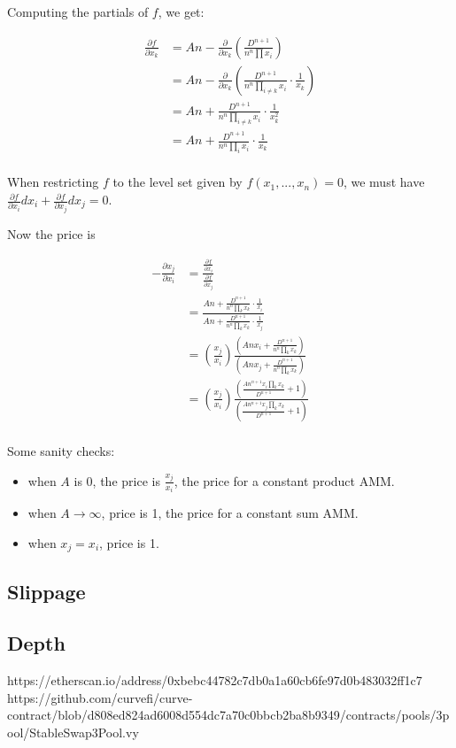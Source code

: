 \documentclass[
]{article}
\providecommand{\tightlist}{%
  \setlength{\itemsep}{0pt}\setlength{\parskip}{0pt}}
\begin{document}
Computing the partials of \(f\), we get:

\[\begin{aligned}
\frac{\partial f}{\partial x_k} &= A n - \frac{\partial}{\partial x_k}\left(\frac{D^{n+1}}{n^n \prod x_i}\right) \\
&= A n -  \frac{\partial}{\partial x_k}\left(\frac{D^{n+1}}{n^n \prod_{i\neq k} x_i} \cdot \frac{1}{x_k}\right)\\
&= A n + \frac{D^{n+1}}{n^n \prod_{i\neq k} x_i} \cdot \frac{1}{x_k^2} \\
&= A n + \frac{D^{n+1}}{n^n \prod_{i} x_i} \cdot \frac{1}{x_k} \\
\end{aligned}\]

When restricting \(f\) to the level set given by
\(f(x_1, ..., x_n) = 0\), we must have
\(\frac{\partial f}{\partial x_i} dx_i + \frac{\partial f}{\partial x_j} dx_j = 0\).

Now the price is

\[\begin{aligned}
- \frac{\partial x_j}{\partial x_i} &= \frac{\frac{\partial f}{\partial x_i}}{\frac{\partial f}{\partial x_j}}\\[1.2ex]
&= \frac{A n + \frac{D^{n+1}}{n^n \prod_{k} x_k} \cdot \frac{1}{x_i}}{A n + \frac{D^{n+1}}{n^n \prod_{k} x_k} \cdot \frac{1}{x_j}} \\[1.2ex]
&= \left( \frac{x_j}{x_i} \right) \frac{\left(A n x_i + \frac{D^{n+1}}{n^n \prod_{k} x_k}\right)}{\left(A n x_j + \frac{D^{n+1}}{n^n \prod_{k} x_k}\right)} \\[1.0ex]
&= \left( \frac{x_j}{x_i} \right) \frac{\left(\frac{A n^{n+1} x_i \prod_k x_k}{D^{n+1}} + 1 \right)}{\left(\frac{A n^{n+1} x_j \prod_k x_k}{D^{n+1}} + 1 \right)} \\[1.0ex]
\end{aligned}\]

Some sanity checks:

\begin{itemize}
\tightlist
\item
  when \(A\) is 0, the price is \(\frac{x_j}{x_i}\), the price for a
  constant product AMM.
\item
  when \(A \rightarrow \infty\), price is 1, the price for a constant
  sum AMM.
\item
  when \(x_j = x_i\), price is 1.
\end{itemize}

\hypertarget{slippage}{%
\subsection{Slippage}\label{slippage}}

\hypertarget{depth}{%
\subsection{Depth}\label{depth}}

https://etherscan.io/address/0xbebc44782c7db0a1a60cb6fe97d0b483032ff1c7
https://github.com/curvefi/curve-contract/blob/d808ed824ad6008d554dc7a70c0bbcb2ba8b9349/contracts/pools/3pool/StableSwap3Pool.vy
\end{document}
